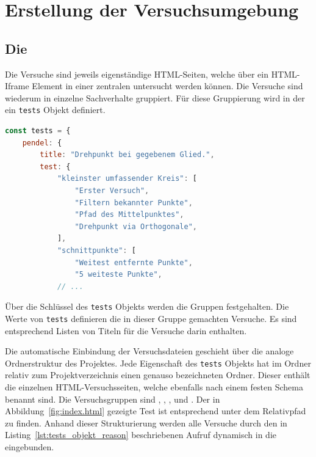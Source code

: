 
\chapter{Erstellung der Versuchsumgebung}


\section{Die }

Die Versuche sind jeweils eigenständige HTML-Seiten, welche über ein HTML-Iframe Element in einer zentralen  untersucht werden können.
Die Versuche sind wiederum in einzelne Sachverhalte gruppiert.
Für diese Gruppierung wird in der  ein \lstinline{tests} Objekt definiert.

\begin{lstlisting}[language=JavaScript, caption={Ausschnitt der Definition des \lstinline{tests} Objekts in der \name{index.html}.}, label={lst:tests_objekt}]
const tests = {
    pendel: {
        title: "Drehpunkt bei gegebenem Glied.",
        test: {
            "kleinster umfassender Kreis": [
                "Erster Versuch",
                "Filtern bekannter Punkte",
                "Pfad des Mittelpunktes",
                "Drehpunkt via Orthogonale",
            ],
            "schnittpunkte": [
                "Weitest entfernte Punkte",
                "5 weiteste Punkte",
            // ...
\end{lstlisting}

Über die Schlüssel des \lstinline{tests} Objekts werden die Gruppen festgehalten.
Die Werte von \lstinline{tests} definieren die in dieser Gruppe gemachten Versuche.
Es sind entsprechend Listen von Titeln für die Versuche darin enthalten.

Die automatische Einbindung der Versuchsdateien geschieht über die analoge Ordnerstruktur des Projektes.
Jede Eigenschaft des \lstinline{tests} Objekts hat im  Ordner relativ zum Projektverzeichnis einen genauso bezeichneten Ordner.
Dieser enthält die einzelnen HTML-Versuchsseiten, welche ebenfalls nach einem festen Schema benannt sind.
Die Versuchsgruppen sind , , ,  und .
Der in Abbildung~\ref{fig:index.html} gezeigte Test ist entsprechend unter dem Relativpfad  zu finden.
Anhand dieser Strukturierung werden alle Versuche durch den in Listing~\ref{lst:tests_objekt_reason} beschriebenen Aufruf dynamisch in die  eingebunden.

